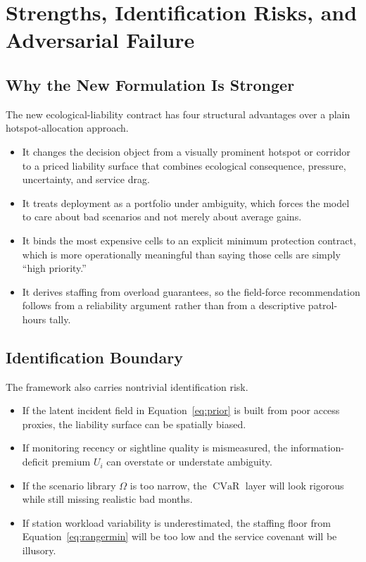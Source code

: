 \section{Strengths, Identification Risks, and Adversarial Failure}
\subsection{Why the New Formulation Is Stronger}
The new ecological-liability contract has four structural advantages over a plain hotspot-allocation approach.
\begin{itemize}
  \item It changes the decision object from a visually prominent hotspot or corridor to a priced liability surface that combines ecological consequence, pressure, uncertainty, and service drag.
  \item It treats deployment as a portfolio under ambiguity, which forces the model to care about bad scenarios and not merely about average gains.
  \item It binds the most expensive cells to an explicit minimum protection contract, which is more operationally meaningful than saying those cells are simply ``high priority.''
  \item It derives staffing from overload guarantees, so the field-force recommendation follows from a reliability argument rather than from a descriptive patrol-hours tally.
\end{itemize}

\subsection{Identification Boundary}
The framework also carries nontrivial identification risk.
\begin{itemize}
  \item If the latent incident field in Equation~\eqref{eq:prior} is built from poor access proxies, the liability surface can be spatially biased.
  \item If monitoring recency or sightline quality is mismeasured, the information-deficit premium \(U_i\) can overstate or understate ambiguity.
  \item If the scenario library \(\Omega\) is too narrow, the \(\operatorname{CVaR}\) layer will look rigorous while still missing realistic bad months.
  \item If station workload variability is underestimated, the staffing floor from Equation~\eqref{eq:rangermin} will be too low and the service covenant will be illusory.
\end{itemize}

